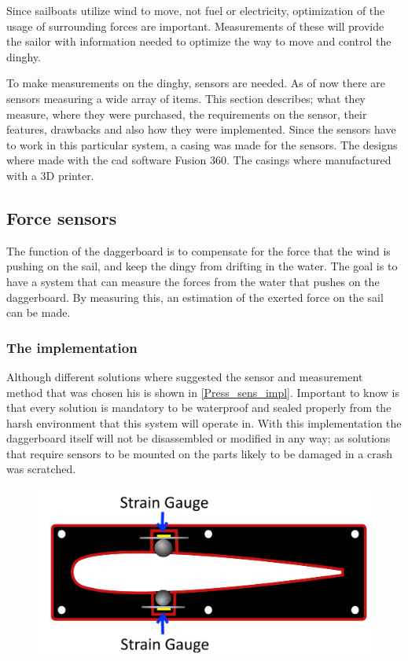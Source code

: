 
Since sailboats utilize wind to move, not fuel or electricity, optimization of the usage of surrounding forces are important. Measurements of these will provide the sailor with information needed to optimize the way to move and control the dinghy.

To make measurements on the dinghy, sensors are needed. As of now there are sensors measuring a wide array of items. This section describes; what they measure, where they were purchased, the requirements on the sensor, their features, drawbacks and also how they were implemented.
Since the sensors have to work in this particular system, a casing was made for the sensors.
The designs where made with the \gls{cad} software Fusion 360\cite{cad}. The casings where manufactured with a 3D printer.

\subsection{Force sensors}
The function of the daggerboard is to compensate for the force that the wind is pushing on the sail, and keep the dingy from drifting in the water. The goal is to have a system that can measure the forces from the water that pushes on the daggerboard. By measuring this, an estimation of the exerted force on the sail can be made. 


\subsubsection{The implementation}
Although different solutions where suggested the sensor and measurement method that was chosen his is shown in \autoref{Press_sens_impl}. 
Important to know is that every solution is mandatory to be waterproof and sealed properly from the harsh environment that this system will operate in. 
With this implementation the daggerboard itself will not be disassembled or modified in any way; as solutions that require sensors to be mounted on the parts likely to be damaged in a crash was scratched.

\begin{figure}[H]
\begin{center}
	\includegraphics[width = .7\textwidth]{Figures/Prototyp_1.png}
	\label{Press_sens_impl}
\end{center}
\end{figure}



